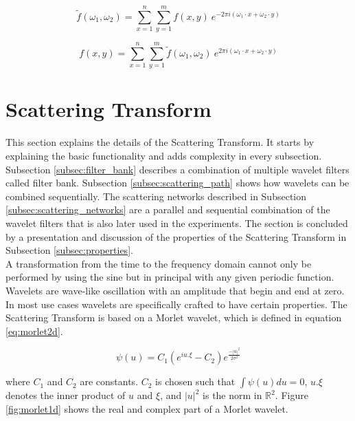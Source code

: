 \begin{equation}
	\tilde{f}(\omega_1, \omega_2) = \sum_{x=1}^{n} \sum_{y=1}^{m} f(x,y)\ e^{-2\pi i (\omega_1 \cdot x + \omega_2 \cdot y)}
\label{eq:forward_FT_2D}
\end{equation}

\begin{equation}
f(x, y) = \sum_{x=1}^{n} \sum_{y=1}^{m} \tilde{f}(\omega_1, \omega_2)\ e^{2\pi i (\omega_1 \cdot x + \omega_2 \cdot y)}
\label{eq:inverse_FT_2D}
\end{equation}


\section{Scattering Transform}
\label{sec:scattering_transform}

This section explains the details of the Scattering Transform. It starts by explaining the basic functionality and adds complexity in every subsection. Subsection \ref{subsec:filter_bank} describes a combination of multiple wavelet filters called filter bank. Subsection \ref{subsec:scattering_path} shows how wavelets can be combined sequentially. The scattering networks described in Subsection \ref{subsec:scattering_networks} are a parallel and sequential combination of the wavelet filters that is also later used in the experiments. The section is concluded by a presentation and discussion of the properties of the Scattering Transform in Subsection \ref{subsec:properties}. \\
A transformation from the time to the frequency domain cannot only be performed by using the sine but in principal with any given periodic function.
Wavelets are wave-like oscillation with an amplitude that begin and end at zero. In most use cases wavelets are specifically crafted to have certain properties. 
The Scattering Transform is based on a Morlet wavelet, which is defined in equation \ref{eq:morlet2d}.

\begin{equation}
\psi(u) = C_1 (e^{iu.\xi} - C_2) e^{\frac{-|u|^2}{2\sigma^2}}
\label{eq:morlet2d}
\end{equation}


where $C_1$ and $C_2$ are constants. $C_2$ is chosen such that $\int \psi(u) du = 0$, $u.\xi$ denotes the inner product of $u$ and $\xi$, and $|u|^2$ is the norm in $\mathbb{R}^2$. 
Figure \ref{fig:morlet1d} shows the real and complex part of a Morlet wavelet.

